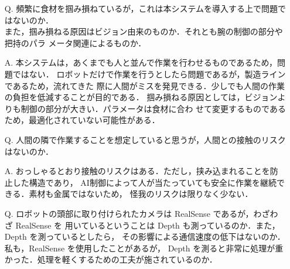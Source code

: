 \documentclass{jsarticle}
\begin{document}
\begin{itemize}
  \addtolength{\itemindent}{5.4zw}
  \item [Q.]頻繁に食材を掴み損ねているが，これは本システムを導入する上で問題ではないのか．\\
  \hspace*{5.5zw}また，掴み損ねる原因はビジョン由来のものか．それとも腕の制御の部分や把持のパラ
  \hspace*{5.5zw}メータ関連によるものか．
  \vspace*{1zh}

  \item [A.]本システムは，あくまでも人と並んで作業を行わせるものであるため，問題ではない．
  \hspace*{5.5zw}ロボットだけで作業を行うとしたら問題であるが，製造ラインであるため，流れてきた
  \hspace*{5.5zw}際に人間がミスを発見できる．少しでも人間の作業の負担を低減することが目的である．
  \hspace*{5.5zw}掴み損ねる原因としては，ビジョンよりも制御の部分が大きい．パラメータは食材に合わ
  \hspace*{5.5zw}せて変更するものであるため，最適化されていない可能性がある．


  \newpage
  \vspace*{-10zh}

  \item [Q.]人間の隣で作業することを想定していると思うが，人間との接触のリスクはないのか．
  \vspace*{1zh}

  \item [A.]おっしゃるとおり接触のリスクはある．ただし，挟み込まれることを防止した構造であり，
  \hspace*{5.5zw}AI制御によって人が当たっていても安全に作業を継続できる．素材も金属ではないため，
  \hspace*{5.5zw}怪我のリスクは限りなく少ない．\\
  \vspace*{1zh}


  \item [Q.]ロボットの頭部に取り付けられたカメラは RealSense であるが，わざわざ RealSense を
  \hspace*{5.5zw}用いているということは Depth も測っているのか．また，Depth を測っているとしたら，
  \hspace*{5.5zw}その影響による通信速度の低下はないのか．私も，RealSense を使用したことがあるが，
  \hspace*{5.5zw}Depth を測ると非常に処理が重かった．処理を軽くするための工夫が施されているのか．
  \vspace*{1zh}


\end{itemize}
\end{document}
